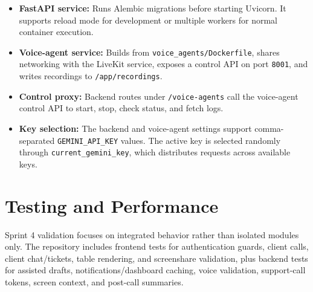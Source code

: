 \begin{itemize}
    \item \textbf{FastAPI service:} Runs Alembic migrations before starting Uvicorn. It supports reload mode for development or multiple workers for normal container execution.
    \item \textbf{Voice-agent service:} Builds from \texttt{voice\_agents/Dockerfile}, shares networking with the LiveKit service, exposes a control API on port \texttt{8001}, and writes recordings to \texttt{/app/recordings}.
    \item \textbf{Control proxy:} Backend routes under \texttt{/voice-agents} call the voice-agent control API to start, stop, check status, and fetch logs.
    \item \textbf{Key selection:} The backend and voice-agent settings support comma-separated \texttt{GEMINI\_API\_KEY} values. The active key is selected randomly through \texttt{current\_gemini\_key}, which distributes requests across available keys.
\end{itemize}

\section{Testing and Performance}

Sprint 4 validation focuses on integrated behavior rather than isolated modules only. The repository includes frontend tests for authentication guards, client calls, client chat/tickets, table rendering, and screenshare validation, plus backend tests for assisted drafts, notifications/dashboard caching, voice validation, support-call tokens, screen context, and post-call summaries.


